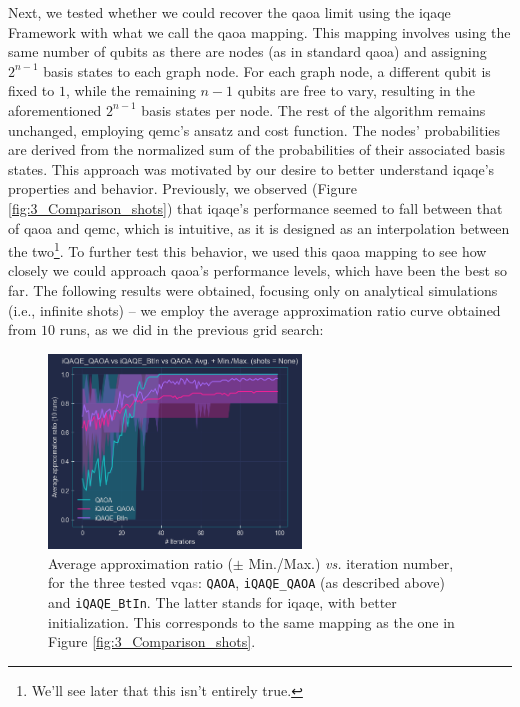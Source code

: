 \vspace{-2.5mm}
Next, we tested whether we could recover the \acrshort{qaoa} limit using the \acrshort{iqaqe} Framework with what we call the \acrshort{qaoa} mapping. This mapping involves using the same number of qubits as there are nodes (as in standard \acrshort{qaoa}) and assigning $2^{n-1}$ basis states to each graph node. For each graph node, a different qubit is fixed to $1$, while the remaining $n - 1$ qubits are free to vary, resulting in the aforementioned $2^{n-1}$ basis states per node. The rest of the algorithm remains unchanged, employing \acrshort{qemc}'s ansatz and cost function. The nodes' probabilities are derived from the normalized sum of the probabilities of their associated basis states. This approach was motivated by our desire to better understand \acrshort{iqaqe}'s properties and behavior. Previously, we observed (Figure \ref{fig:3_Comparison_shots}) that \acrshort{iqaqe}'s performance seemed to fall between that of \acrshort{qaoa} and \acrshort{qemc}, which is intuitive, as it is designed as an interpolation between the two\footnote{We'll see later that this isn't entirely true.}. To further test this behavior, we used this \acrshort{qaoa} mapping to see how closely we could approach \acrshort{qaoa}'s performance levels, which have been the best so far. The following results were obtained, focusing only on analytical simulations (i.e., infinite shots) – we employ the average approximation ratio curve obtained from $10$ runs, as we did in the previous grid search:
\vspace{-2.5mm}
\begin{figure}[H]
  \centering
  \includegraphics[width=0.60\textwidth]{Figures/Chapter_5/iQAQE_QAOA.png}
  \caption{Average approximation ratio ($\pm$ Min./Max.) \textit{vs.} iteration number, for the three tested \acrshort{vqa}\textcolor{gray}{s}: \texttt{QAOA}, \texttt{iQAQE\_QAOA} (as described above) and \texttt{iQAQE\_BtIn}. The latter stands for \acrshort{iqaqe}, with better initialization. This corresponds to the same mapping as the one in Figure \ref{fig:3_Comparison_shots}.}
  \label{fig:iQAQE_QAOA}
\end{figure}
